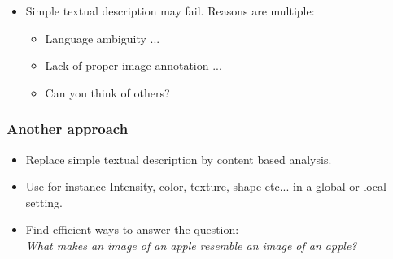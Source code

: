 \documentclass[10pt]{beamer}
\begin{document}
\begin{frame}
  \begin{itemize}
  \item Simple textual description may fail. Reasons are multiple:
    \begin{itemize}
    \item Language ambiguity ...
    \item  Lack of proper image annotation ...
    \item Can you think of others?
    \end{itemize}
  \end{itemize}
\end{frame}



\begin{frame}
  \frametitle{Another approach}
  \begin{itemize}
  \item Replace simple textual description by content based analysis.  
  \item Use for instance Intensity, color, texture, shape etc... in a
    global or local setting.
  \item Find efficient ways to answer the question:\\
    \emph{What makes an image of an apple resemble an image of an apple?}
  \end{itemize}
\end{frame}
\end{document}
